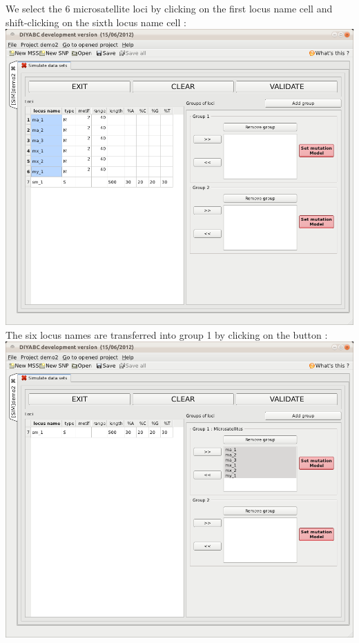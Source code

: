 We select the 6 microsatellite loci by clicking on the first locus name cell and shift-clicking on the sixth locus name cell :\\

\includegraphics[scale=0.33]{gui_pictures/Capture-DIYABC-76.png} \\

The six locus names are transferred into group 1 by clicking on the \fbox{\textsf{  >>  }} button :\\

\includegraphics[scale=0.33]{gui_pictures/Capture-DIYABC-77.png} \\

